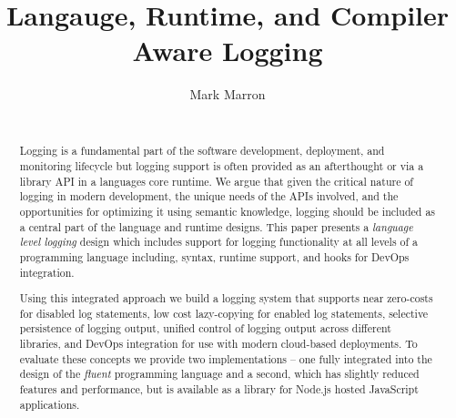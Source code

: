 \documentclass[preprint]{sig-alternate-05-2015}
\newcommand{\ourtitle}{Langauge, Runtime, and Compiler Aware Logging}
\begin{document}





\title{\ourtitle}

\author{
Mark Marron\\
       \\
}

\maketitle

\begin{abstract} 
Logging is a fundamental part of the software development, deployment, and
monitoring lifecycle but logging support is often provided as an afterthought or
via a library API in a languages core runtime. We argue that given the critical
nature of logging in modern development, the unique needs of the APIs involved,
and the opportunities for optimizing it using semantic knowledge, logging should
be included as a central part of the language and runtime designs. This paper
presents a \emph{language level logging} design which includes support for
logging functionality at all levels of a programming language including, syntax,
runtime support, and hooks for DevOps integration.

Using this integrated approach we build a logging system that supports near
zero-costs for disabled log statements, low cost lazy-copying for enabled log
statements, selective persistence of logging output, unified control of logging
output across different libraries, and DevOps integration for use with modern
cloud-based deployments. To evaluate these concepts we provide two
implementations -- one fully integrated into the design of the \emph{fluent}
programming language and a second, which has slightly reduced features and
performance, but is available as a library for Node.js hosted JavaScript
applications.
\end{abstract}

\end{document}
